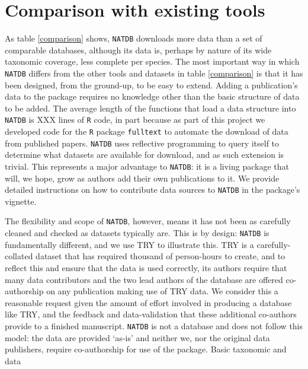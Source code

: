 \documentclass[12pt]{report}
\newcommand{\R}{\texttt{R}\xspace}
\newcommand{\natdb}{\texttt{NATDB}\xspace}
\begin{document}
\section{Comparison with existing tools}
As table \ref{comparison} shows, \natdb downloads more data than a set
of comparable databases, although its data is, perhaps by nature of
its wide taxonomic coverage, less complete per species. The most
important way in which \natdb differs from the other tools and
datasets in table \ref{comparison} is that it has been designed, from
the ground-up, to be easy to extend. Adding a publication's data to
the package requires no knowledge other than the basic structure of
data to be added. The average length of the functions that load a data
structure into \natdb is XXX lines of \R code, in part because as part
of this project we developed code for the \R package \texttt{fulltext}
\autocite{Chamberlain2015} to automate the download of data from
published papers. \natdb uses reflective programming to query itself
to determine what datasets are available for download, and as such
extension is trivial. This represents a major advantage to \natdb: it
is a living package that will, we hope, grow as authors add their own
publications to it. We provide detailed instructions on how to
contribute data sources to \natdb in the package's vignette.

The flexibility and scope of \natdb, however, means it has not been as
carefully cleaned and checked as datasets typically are. This is by
design: \natdb is fundamentally different, and we use TRY
\autocite{Kattge2011} to illustrate this. TRY is a carefully-collated
dataset that has required thousand of person-hours to create, and to
reflect this and ensure that the data is used correctly, its authors
require that many data contributors and the two lead authors of the
database are offered co-authorship on any publication making use of
TRY data. We consider this a reasonable request given the amount of
effort involved in producing a database like TRY, and the feedback and
data-validation that these additional co-authors provide to a finished
manuscript. \natdb is not a database and does not follow this model:
the data are provided `as-is' and neither we, nor the original data
publishers, require co-authorship for use of the package. Basic
taxonomic and data %
\end{document}
